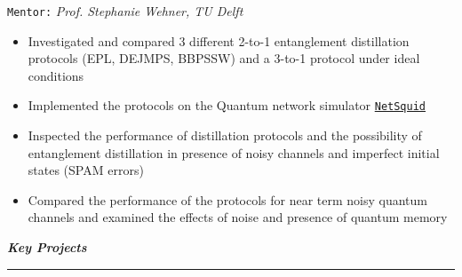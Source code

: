 \documentclass[11pt,a4paper]{article}
\begin{document}
\begin{itemize}
    \texttt{Mentor:} \textit{Prof. Stephanie Wehner, TU Delft} \hfill
    \begin{itemize}
        \item Investigated and compared 3 different 2-to-1 entanglement distillation protocols (EPL, DEJMPS, BBPSSW) and a 3-to-1 protocol under ideal conditions
        \item Implemented the protocols on the Quantum network simulator \href{https://netsquid.org/}{\texttt{NetSquid}}
        \item Inspected the performance of distillation protocols and the possibility of entanglement distillation in presence of noisy channels and imperfect initial states (SPAM errors)
        \item Compared the performance of the protocols for near term noisy quantum channels and examined the effects of noise and presence of quantum memory
    \end{itemize}
    \iffalse
\end{itemize}
\color{myBlue}
\vspace{0.2cm}
\noindent \Large\textbf{\textit{Key Projects}} \vspace{0.15cm} \normalsize
\color{gray} \hrule
\color{black}
\end{document}
